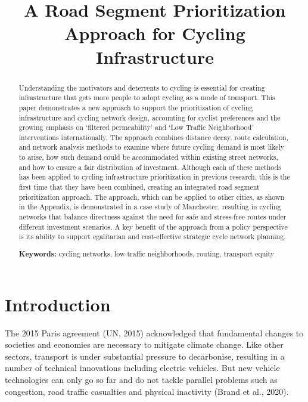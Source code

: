 \documentclass[
]{article}
\title{A Road Segment Prioritization Approach for Cycling Infrastructure}
\author{}
\date{\vspace{-2.5em}}
\begin{document}
\maketitle
\begin{abstract}
Understanding the motivators and deterrents to cycling is essential for creating infrastructure that gets more people to adopt cycling as a mode of transport. This paper demonstrates a new approach to support the prioritization of cycling infrastructure and cycling network design, accounting for cyclist preferences and the growing emphasis on `filtered permeability' and `Low Traffic Neighborhood' interventions internationally. The approach combines distance decay, route calculation, and network analysis methods to examine where future cycling demand is most likely to arise, how such demand could be accommodated within existing street networks, and how to ensure a fair distribution of investment. Although each of these methods has been applied to cycling infrastructure prioritization in previous research, this is the first time that they have been combined, creating an integrated road segment prioritization approach. The approach, which can be applied to other cities, as shown in the Appendix, is demonstrated in a case study of Manchester, resulting in cycling networks that balance directness against the need for safe and stress-free routes under different investment scenarios. A key benefit of the approach from a policy perspective is its ability to support egalitarian and cost-effective strategic cycle network planning.

\par

\textbf{Keywords:} cycling networks, low-traffic neighborhoods, routing, transport equity
\end{abstract}

\hypertarget{introduction}{%
\section{Introduction}\label{introduction}}

The 2015 Paris agreement (UN, 2015) acknowledged that
fundamental changes to societies and economies are necessary to mitigate
climate change. Like other sectors, transport is under substantial
pressure to decarbonise, resulting in a number of technical innovations
including electric vehicles. But new vehicle technologies can only go so
far and do not tackle parallel problems such as congestion, road traffic
casualties and physical inactivity (Brand et al., 2020).
\end{document}

